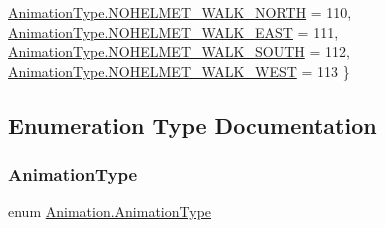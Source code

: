 \begin{DoxyCompactItemize}
\newline
\hyperlink{namespace_animation_a2088578945c96e9b64b66bd44b2c57c8afde8f2fb4e0206c69d1af1d8ff1d863c}{Animation\+Type.\+N\+O\+H\+E\+L\+M\+E\+T\+\_\+\+W\+A\+L\+K\+\_\+\+N\+O\+R\+TH} = 110, 
\hyperlink{namespace_animation_a2088578945c96e9b64b66bd44b2c57c8a6c4452fdc5bad5cf1a894f47591e119c}{Animation\+Type.\+N\+O\+H\+E\+L\+M\+E\+T\+\_\+\+W\+A\+L\+K\+\_\+\+E\+A\+ST} = 111, 
\hyperlink{namespace_animation_a2088578945c96e9b64b66bd44b2c57c8acdf12d13d9fbdaacb8bba0888530ee6a}{Animation\+Type.\+N\+O\+H\+E\+L\+M\+E\+T\+\_\+\+W\+A\+L\+K\+\_\+\+S\+O\+U\+TH} = 112, 
\hyperlink{namespace_animation_a2088578945c96e9b64b66bd44b2c57c8aaa37ffff954ae11f7733d53d4d7d60a2}{Animation\+Type.\+N\+O\+H\+E\+L\+M\+E\+T\+\_\+\+W\+A\+L\+K\+\_\+\+W\+E\+ST} = 113
 \}
\end{DoxyCompactItemize}


\subsection{Enumeration Type Documentation}
\mbox{\label{namespace_animation_a2088578945c96e9b64b66bd44b2c57c8}} 
\subsubsection{\texorpdfstring{Animation\+Type}{AnimationType}}
{\footnotesize\ttfamily enum \hyperlink{namespace_animation_a2088578945c96e9b64b66bd44b2c57c8}{Animation.\+Animation\+Type}\hspace{0.3cm}{\ttfamily [strong]}}

